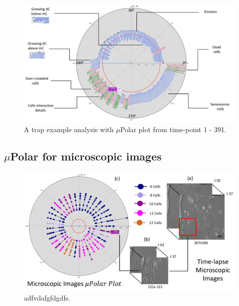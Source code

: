 \documentclass[conference]{IEEEtran}
\begin{document}
\begin{figure}
\centering
\includegraphics[width=\textwidth,height=10 cm]{Patterns/explain.pdf}
\caption{A trap example analysis with $\mu$Polar plot from time-point 1 - 391.}
\label{fig:explain}
\end{figure}


\subsection{$\mu$Polar for microscopic images}

\begin{figure}
\centering
\includegraphics[width=\textwidth,height=10 cm]{Patterns/microscopic.pdf}
\caption{ adfvdafgfdgdfs.}
\label{fig:areaoff}
\end{figure}
\end{document}
